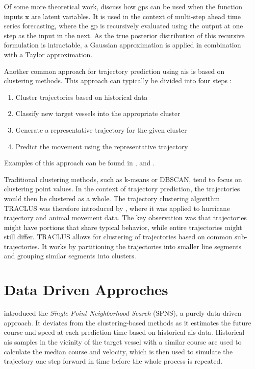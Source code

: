 Of some more theoretical work, \citeauthor{multistep_gp}\cite{multistep_gp} discuss how \acrshort{gp}s can be used when the function inputs $\boldsymbol{x}$ are latent variables. It is used in the context of multi-step ahead time series forecasting, where the \acrshort{gp} is recursively evaluated using the output at one step as the input in the next. As the true posterior distribution of this recursive formulation is intractable, a Gaussian approximation is applied in combination with a Taylor approximation.




Another common approach for trajectory prediction using \acrshort{ais} is based on clustering methods. This approach can typically be divided into four steps \cite{dalsnes-hexeberg}:

\begin{enumerate}
    \item Cluster trajectories based on historical data
    \item Classify new target vessels into the appropriate cluster
    \item Generate a representative trajectory for the given cluster
    \item Predict the movement using the representative trajectory
\end{enumerate}

Examples of this approach can be found in \cite{palotta}, \cite{mazzarella} and \cite{mazzarella2}. 


Traditional clustering methods, such as k-means or DBSCAN, tend to focus on clustering point values. In the context of trajectory prediction, the trajectories would then be clustered as a whole. The trajectory clustering algorithm TRACLUS was therefore introduced by \cite{traclus}, where it was applied to hurricane trajectory and animal movement data. The key observation was that trajectories might have portions that share typical behavior, while entire trajectories might still differ. TRACLUS allows for clustering of trajectories based on common sub-trajectories. It works by partitioning the trajectories into smaller line segments and grouping similar segments into clusters. 

\section{Data Driven Approches}
\citeauthor{Hexeberg2017AISbasedVT} \cite{Hexeberg2017AISbasedVT} introduced the \textit{Single Point Neighborhood Search} (SPNS), a purely data-driven approach. It deviates from the clustering-based methods as it estimates the future course and speed at each prediction time based on historical \acrshort{ais} data. 
Historical \acrshort{ais} samples in the vicinity of the target vessel with a similar course are used to calculate the median course and velocity, which is then used to simulate the trajectory one step forward in time before the whole process is repeated. 

